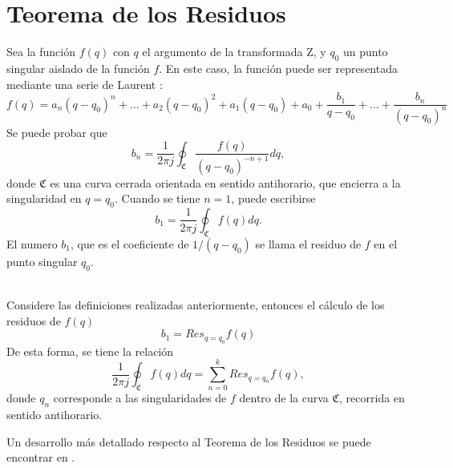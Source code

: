 \newpage
\section{Teorema de los Residuos}
Sea la funci\'on $f(q)$ con $q$ el argumento de la transformada Z, y $q_0$ un punto singular aislado de la funci\'on $f$. En este caso, la funci\'on puede ser representada mediante una serie de Laurent \cite{chubro90}:
\begin{equation}
f(q)=a_n(q-q_0)^n+\ldots+a_2(q-q_0)^2+a_1(q-q_0)+a_0+\frac{b_1}{q-q_0}+\ldots+\frac{b_n}{(q-q_0)^n}
\end{equation}
Se puede probar que
\begin{equation}
b_n=\frac{1}{2\pi j}\oint_{\mathfrak{C}} \frac{f(q)}{(q-q_0)^{-n+1}}dq,
\end{equation}
donde $\mathfrak{C}$ es una curva cerrada orientada en sentido antihorario, que encierra a la singularidad en $q=q_0$. Cuando se tiene $n=1$, puede escribirse
\begin{equation}
b_1=\frac{1}{2\pi j}\oint_{\mathfrak{C}} f(q)dq.
\end{equation}
El numero $b_1$, que es el coeficiente de $1/(q-q_0)$ se llama el residuo de $f$ en el punto singular $q_0$.

\begin{teo}\label{teo:residuos}{\ \\}
Considere las definiciones realizadas anteriormente, entonces el c\'alculo de los residuos de $f(q)$
\begin{equation}
b_1 = Res_{q=q_0}f(q)
\end{equation}
De esta forma, se tiene la relaci\'on
\begin{equation}
\frac{1}{2\pi j}\oint_{\mathfrak{C}} f(q)dq=\sum_{n=0}^kRes_{q=q_n}f(q),
\end{equation}
donde $q_n$ corresponde a las singularidades de $f$ dentro de la curva $\mathfrak{C}$, recorrida en sentido antihorario.
\end{teo}
Un desarrollo m\'as detallado respecto al Teorema de los Residuos se puede encontrar en \cite{chubro90}.